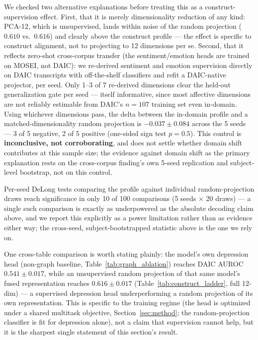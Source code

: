 \documentclass[letterpaper]{article}
\begin{document}
We checked two alternative explanations before treating this as a construct-supervision effect. First, that it is merely dimensionality reduction of any kind: PCA-12, which is unsupervised, lands within noise of the random projection ($0.610$ vs.\ $0.616$) and clearly above the construct profile — the effect is specific to construct alignment, not to projecting to 12 dimensions per se. Second, that it reflects zero-shot cross-corpus transfer (the sentiment/emotion heads are trained on MOSEI, not DAIC): we re-derived sentiment and emotion supervision directly on DAIC transcripts with off-the-shelf classifiers \citep{cardiffnlp2021twitter,hartmann2022emotion} and refit a DAIC-native projector, per seed. Only 1--3 of 7 re-derived dimensions clear the held-out generalization gate per seed — itself informative, since most affective dimensions are not reliably estimable from DAIC's $n{=}107$ training set even in-domain. Using whichever dimensions pass, the delta between the in-domain profile and a matched-dimensionality random projection is $-0.037 \pm 0.084$ across the 5 seeds — 3 of 5 negative, 2 of 5 positive (one-sided sign test $p{=}0.5$). This control is \textbf{inconclusive, not corroborating}, and does not settle whether domain shift contributes at this sample size; the evidence against domain shift as the primary explanation rests on the cross-corpus finding's own 5-seed replication and subject-level bootstrap, not on this control.

Per-seed DeLong tests comparing the profile against individual random-projection draws reach significance in only 10 of 100 comparisons (5 seeds $\times$ 20 draws) — a single such comparison is exactly as underpowered as the absolute decoding claim above, and we report this explicitly as a power limitation rather than as evidence either way; the cross-seed, subject-bootstrapped statistic above is the one we rely on.

One cross-table comparison is worth stating plainly: the model's own depression head (non-graph baseline, Table~\ref{tab:graph_ablation}) reaches DAIC AUROC $0.541\pm0.017$, while an unsupervised random projection of that same model's fused representation reaches $0.616\pm0.017$ (Table~\ref{tab:construct_ladder}, full 12-dim) — a supervised depression head underperforming a random projection of its own representation. This is specific to the training regime (the head is optimized under a shared multitask objective, Section~\ref{sec:method}; the random-projection classifier is fit for depression alone), not a claim that supervision cannot help, but it is the sharpest single statement of this section's result.
\end{document}
